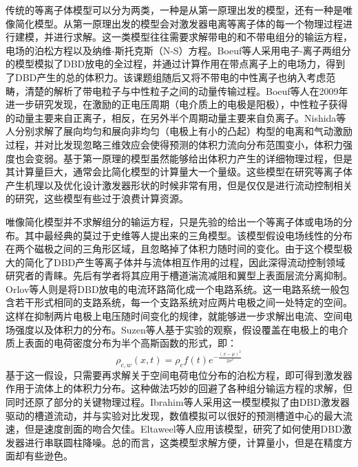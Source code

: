传统的等离子体模型可以分为两类，一种是从第一原理出发的模型，还有一种是唯像简化模型。从第一原理出发的模型会对激发器电离等离子体的每一个物理过程进行建模，并进行求解。这一类模型往往需要求解带电的和不带电组分的输运方程，电场的泊松方程以及纳维-斯托克斯（N-S）方程。Boeuf等人\cite{Boeuf2007}采用电子-离子两组分的模型模拟了DBD放电的全过程，并通过计算作用在带点离子上的电场力，得到了DBD产生的总的体积力。该课题组随后又将不带电的中性离子也纳入考虑范畴，清楚的解析了带电粒子与中性粒子之间的动量传输过程。Boeuf等人\cite{Boeuf2009}在2009年进一步研究发现，在激励的正电压周期（电介质上的电极是阳极），中性粒子获得的动量主要来自正离子，相反，在另外半个周期动量主要来自负离子。Nishida等人\cite{Nishida2016,Nishida2011}分别求解了展向均匀和展向非均匀（电极上有小的凸起）构型的电离和气动激励过程，并对比发现忽略三维效应会使得预测的体积力流向分布范围变小，体积力强度也会变弱。基于第一原理的模型虽然能够给出体积力产生的详细物理过程，但是其计算量巨大，通常会比简化模型的计算量大一个量级。这些模型在研究等离子体产生机理以及优化设计激发器形状的时候非常有用，但是仅仅是进行流动控制相关的研究，这些模型有些过于浪费计算资源。

唯像简化模型并不求解组分的输运方程，只是先验的给出一个等离子体或电场的分布。其中最经典的莫过于史维等人提出来的三角模型\cite{shyy2002}。该模型假设电场线性的分布在两个磁极之间的三角形区域，且忽略掉了体积力随时间的变化。由于这个模型极大的简化了DBD产生等离子体并与流体相互作用的过程，因此深得流动控制领域研究者的青睐。先后有学者将其应用于槽道湍流减阻\cite{LiZX2015}和翼型上表面层流分离抑制\cite{Rizzetta2011}。Orlov等人\cite{Orlov2006,Corke2008,Mertz2011}则是将DBD放电的电流环路简化成一个电路系统。这一电路系统一般包含若干形式相同的支路系统，每一个支路系统对应两片电极之间一处特定的空间。这样在抑制两片电极上电压随时间变化的规律，就能够进一步求解出电流、空间电场强度以及体积力的分布。Suzen等人\cite{suzen2005,suzen2007}基于实验\cite{Enloe2004,enloe2006}的观察，假设覆盖在电极上的电介质上表面的电荷密度分布为半个高斯函数的形式，即：
\begin{equation}\label{e:suzen}
  \rho_{c,w}(x,t)=\rho_cf(t)e^{-\frac{(x-\mu)^2}{2\sigma^2}}
\end{equation}
基于这一假设，只需要再求解关于空间电荷电位分布的泊松方程，即可得到激发器作用于流体上的体积力分布。这种做法巧妙的回避了各种组分输运方程的求解，但同时还原了部分的关键物理过程。Ibrahim等人\cite{Ibrahim2014}采用这一模型模拟了由DBD激发器驱动的槽道流动，并与实验\cite{Debiasi2011}对比发现，数值模拟可以很好的预测槽道中心的最大流速，但是速度剖面的吻合欠佳。Eltaweel等人\cite{Eltaweel2014}应用该模型，研究了如何使用DBD激发器进行串联圆柱降噪。总的而言，这类模型求解方便，计算量小，但是在精度方面却有些逊色。

